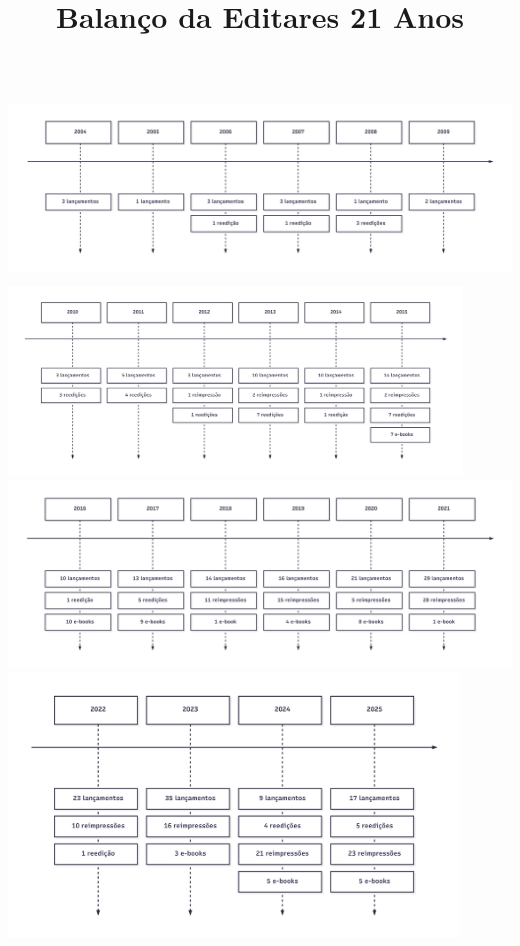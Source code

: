 \documentclass{gescons}
\title{Balanço da Editares 21 Anos}
\begin{document}
    \makeentrevistatitle


    
    
\begin{center}
    
    \includegraphics[height=5cm]{articles/balanco/grafico/balanco1.png} 
    \includegraphics[height=5cm]{articles/balanco/grafico/balanco2.png}  
    \includegraphics[height=5cm]{articles/balanco/grafico/balanco3.png}  
    \includegraphics[height=7cm]{articles/balanco/grafico/balanco4.png}  

\end{center}
    


\end{document}
